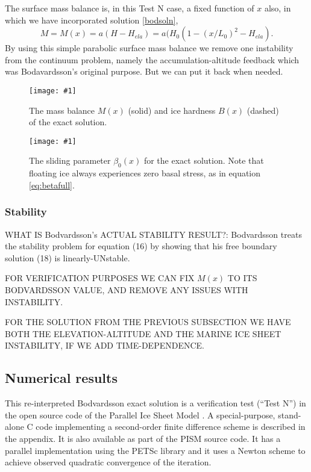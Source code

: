 \documentclass[twocolumn,letterpaper]{igs}
\newcommand{\onecol}[1]{\texttt{[image: \#1]}}
\begin{document}
The surface mass balance is, in this Test N case, a fixed function of $x$ also, in which we have incorporated solution \eqref{bodsoln},
	$$M = M(x) = a(H-H_{ela}) = a(H_0(1 - (x/L_0)^2 - H_{ela}).$$
By using this simple parabolic surface mass balance we remove one instability from the continuum problem, namely the accumulation-altitude feedback which was Bodavardsson's original purpose.  But we can put it back when needed.


\begin{figure}[ht]
\onecol{exactmarine-M-B}
\caption{The mass balance $M(x)$ (solid) and ice hardness $B(x)$ (dashed) of the exact solution.} \label{fig:exactMB}
\end{figure}

\begin{figure}[ht]
\onecol{exactmarine-beta}
\caption{The sliding parameter $\beta_0(x)$ for the exact solution.  Note that floating ice always experiences zero basal stress, as in equation \eqref{eq:betafull}.} \label{fig:exactbeta}
\end{figure}


\subsubsection*{Stability}
WHAT IS Bodvardsson's ACTUAL STABILITY RESULT?:  Bodvardsson treats the stability problem for equation (16) by showing that his free boundary solution (18) is linearly-UNstable.

FOR VERIFICATION PURPOSES WE CAN FIX $M(x)$ TO ITS BODVARDSSON VALUE, AND REMOVE ANY ISSUES WITH INSTABILITY.

FOR THE SOLUTION FROM THE PREVIOUS SUBSECTION WE HAVE BOTH THE ELEVATION-ALTITUDE AND THE MARINE ICE SHEET INSTABILITY, IF WE ADD TIME-DEPENDENCE.



\subsection*{Numerical results}

This re-interpreted Bodvardsson exact solution is a verification test (``Test N'') in the open source code of the Parallel Ice Sheet Model \citep[PISM; ][]{pism-user-manual}.  A special-purpose, stand-alone C code implementing a second-order finite difference scheme is described in the appendix.  It is also available as part of the PISM source code.  It has a parallel implementation using the PETSc \citep{petsc-user-ref} library and it uses a Newton scheme to achieve observed quadratic convergence of the iteration.
\end{document}

